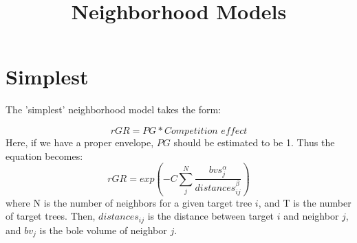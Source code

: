 \documentclass{article}
\title{Neighborhood Models}
\begin{document}
\maketitle


\section{Simplest}
The 'simplest' neighborhood model takes the form:

\begin{equation}
  rGR = PG * Competition\,\, {effect}
\end{equation}
Here, if we have a proper envelope, $PG$ should be estimated to be 1.  Thus the equation
becomes:
\begin{equation}
  rGR = exp \left ( -C \sum^N_j \frac{bvs_{j}^\alpha}{distances_{ij}^\beta} \right )
\end{equation}
where N is the number of neighbors for a given target tree $i$, and T is the number of target trees.  Then, $distances_{ij}$ is the distance between target $i$ and neighbor $j$,
and $bv_j$ is the bole volume of neighbor $j$.
\end{document}
